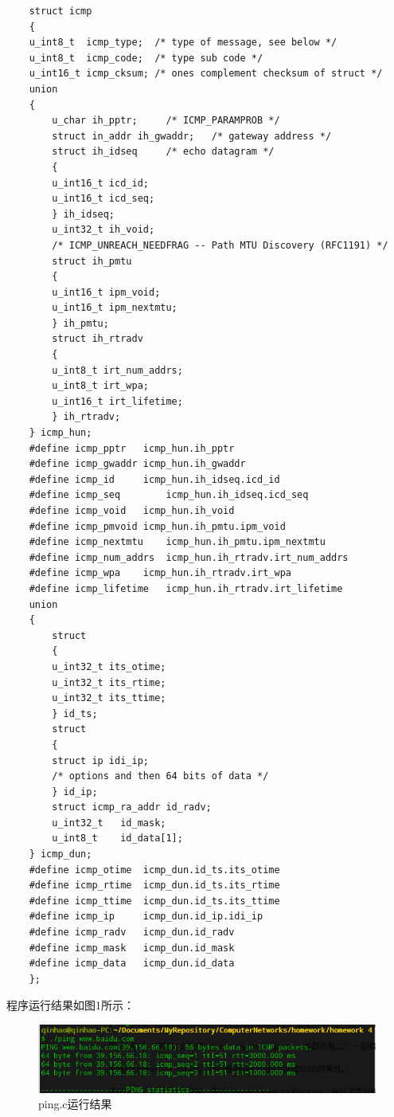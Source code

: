 \documentclass[a4paper,UTF8]{article}
\begin{document}
\begin{lstlisting}
    struct icmp
    {
    u_int8_t  icmp_type;  /* type of message, see below */
    u_int8_t  icmp_code;  /* type sub code */
    u_int16_t icmp_cksum; /* ones complement checksum of struct */
    union
    {
        u_char ih_pptr;     /* ICMP_PARAMPROB */
        struct in_addr ih_gwaddr;   /* gateway address */
        struct ih_idseq     /* echo datagram */
        {
        u_int16_t icd_id;
        u_int16_t icd_seq;
        } ih_idseq;
        u_int32_t ih_void;
        /* ICMP_UNREACH_NEEDFRAG -- Path MTU Discovery (RFC1191) */
        struct ih_pmtu
        {
        u_int16_t ipm_void;
        u_int16_t ipm_nextmtu;
        } ih_pmtu;
        struct ih_rtradv
        {
        u_int8_t irt_num_addrs;
        u_int8_t irt_wpa;
        u_int16_t irt_lifetime;
        } ih_rtradv;
    } icmp_hun;
    #define icmp_pptr   icmp_hun.ih_pptr
    #define icmp_gwaddr icmp_hun.ih_gwaddr
    #define icmp_id     icmp_hun.ih_idseq.icd_id
    #define icmp_seq        icmp_hun.ih_idseq.icd_seq
    #define icmp_void   icmp_hun.ih_void
    #define icmp_pmvoid icmp_hun.ih_pmtu.ipm_void
    #define icmp_nextmtu    icmp_hun.ih_pmtu.ipm_nextmtu
    #define icmp_num_addrs  icmp_hun.ih_rtradv.irt_num_addrs
    #define icmp_wpa    icmp_hun.ih_rtradv.irt_wpa
    #define icmp_lifetime   icmp_hun.ih_rtradv.irt_lifetime
    union
    {
        struct
        {
        u_int32_t its_otime;
        u_int32_t its_rtime;
        u_int32_t its_ttime;
        } id_ts;
        struct
        {
        struct ip idi_ip;
        /* options and then 64 bits of data */
        } id_ip;
        struct icmp_ra_addr id_radv;
        u_int32_t   id_mask;
        u_int8_t    id_data[1];
    } icmp_dun;
    #define icmp_otime  icmp_dun.id_ts.its_otime
    #define icmp_rtime  icmp_dun.id_ts.its_rtime
    #define icmp_ttime  icmp_dun.id_ts.its_ttime
    #define icmp_ip     icmp_dun.id_ip.idi_ip
    #define icmp_radv   icmp_dun.id_radv
    #define icmp_mask   icmp_dun.id_mask
    #define icmp_data   icmp_dun.id_data
    };
\end{lstlisting}
程序运行结果如图1所示：
\begin{figure}[htbp]
    \centering
    \includegraphics[width=1\textwidth]{ping.png}
    \caption{ping.c运行结果}
    \label{pingImg}
\end{figure}
\end{document}
